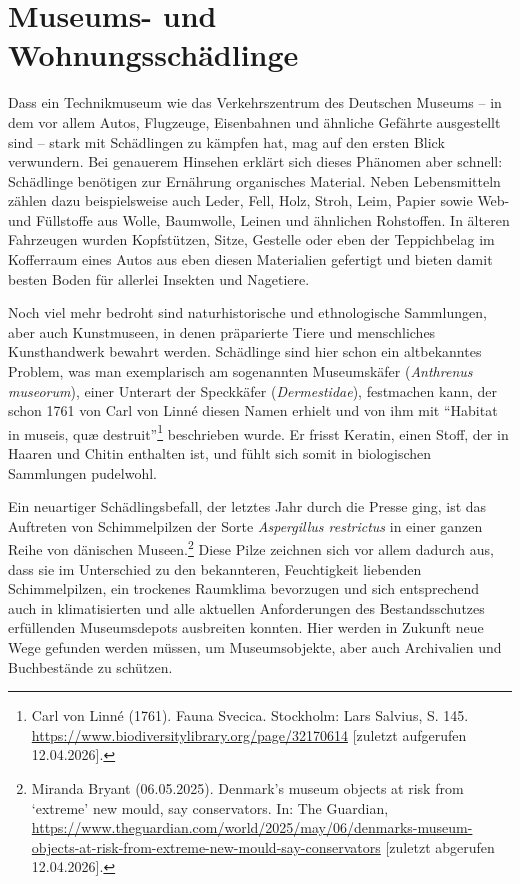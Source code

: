 \documentclass[a4paper,
fontsize=11pt,
oneside,
numbers=noperiodatend,
parskip=half-,
bibliography=totoc,
final
]{scrartcl}
\begin{document}
\section{Museums- und
Wohnungsschädlinge}\label{museums--und-wohnungsschuxe4dlinge}

Dass ein Technikmuseum wie das Verkehrszentrum des Deutschen Museums --
in dem vor allem Autos, Flugzeuge, Eisenbahnen und ähnliche Gefährte
ausgestellt sind -- stark mit Schädlingen zu kämpfen hat, mag auf den
ersten Blick verwundern. Bei genauerem Hinsehen erklärt sich dieses
Phänomen aber schnell: Schädlinge benötigen zur Ernährung organisches
Material. Neben Lebensmitteln zählen dazu beispielsweise auch Leder,
Fell, Holz, Stroh, Leim, Papier sowie Web- und Füllstoffe aus Wolle,
Baumwolle, Leinen und ähnlichen Rohstoffen. In älteren Fahrzeugen wurden
Kopfstützen, Sitze, Gestelle oder eben der Teppichbelag im Kofferraum
eines Autos aus eben diesen Materialien gefertigt und bieten damit
besten Boden für allerlei Insekten und Nagetiere.

Noch viel mehr bedroht sind naturhistorische und ethnologische
Sammlungen, aber auch \linebreak Kunstmuseen, in denen präparierte Tiere und
menschliches Kunsthandwerk bewahrt werden. Schädlinge sind hier schon
ein altbekanntes Problem, was man exemplarisch am sogenannten
Museumskäfer (\emph{Anthrenus museorum}), einer Unterart der Speckkäfer
(\emph{Dermestidae}), festmachen kann, der schon 1761 von Carl von Linné
diesen Namen erhielt und von ihm mit \enquote{Habitat in museis, quæ
destruit}\footnote{Carl von Linné (1761). Fauna Svecica. Stockholm: Lars
  Salvius, S. 145.
  \url{https://www.biodiversitylibrary.org/page/32170614} {[}zuletzt
  aufgerufen 12.04.2026{]}.} beschrieben wurde. Er frisst Keratin, einen
Stoff, der in Haaren und Chitin enthalten ist, und fühlt sich somit in
biologischen Sammlungen pudelwohl.

Ein neuartiger Schädlingsbefall, der letztes Jahr durch die Presse ging,
ist das Auftreten von Schimmelpilzen der Sorte \emph{Aspergillus
restrictus} in einer ganzen Reihe von dänischen Museen.\footnote{Miranda
  Bryant (06.05.2025). Denmark's museum objects at risk from
  \enquote*{extreme} new mould, say conservators. In: The Guardian,
  \url{https://www.theguardian.com/world/2025/may/06/denmarks-museum-objects-at-risk-from-extreme-new-mould-say-conservators}
  {[}zuletzt abgerufen 12.04.2026{]}.} Diese Pilze zeichnen sich vor
allem dadurch aus, dass sie im Unterschied zu den bekannteren,
Feuchtigkeit liebenden Schimmelpilzen, ein trockenes Raumklima
bevorzugen und sich entsprechend auch in klimatisierten und alle
aktuellen Anforderungen des Bestandsschutzes erfüllenden Museumsdepots
ausbreiten konnten. Hier werden in Zukunft neue Wege gefunden werden
müssen, um Museumsobjekte, aber auch Archivalien und Buchbestände zu
schützen.
\end{document}
